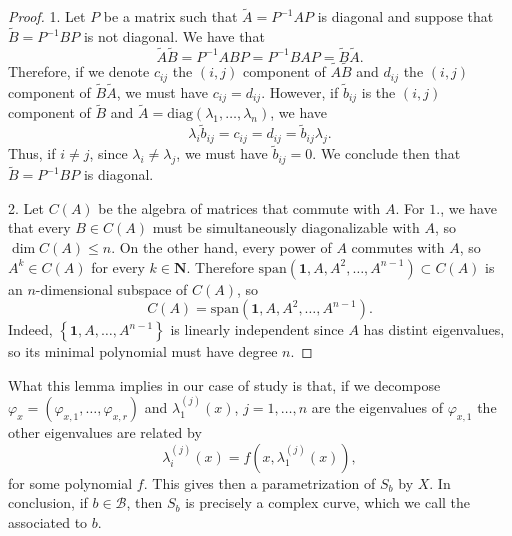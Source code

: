 \documentclass[12pt,a4paper]{book}
\theoremstyle{definition} \newtheorem{defn}[thm]{Definition}
\theoremstyle{definition} \newtheorem{ejemplo}[thm]{Example}
\theoremstyle{remark} \newtheorem{rem}[thm]{Remark}
\def\BB{\mathscr{B}}
\def\NN{\mathbf{N}}
\def\id{\mathbf{1}}
\let\emph\relax
\begin{document}
  \begin{proof}
    1. Let $P$ be a matrix such that $\tilde{A}=P^{-1}A P$ is diagonal and suppose that $\tilde{B}=P^{-1} B P$ is not diagonal. We have that
    \begin{equation*}
      \tilde{A}\tilde{B} = P^{-1} AB P = P^{-1} BA P = \tilde{B} \tilde{A}.
    \end{equation*}
    Therefore, if we denote $c_{ij}$ the $(i,j)$ component of $\tilde{A}\tilde{B}$ and $d_{ij}$ the $(i,j)$ component of $\tilde{B}\tilde{A}$, we must have $c_{ij} = d_{ij}$. However, if $\tilde{b}_{ij}$ is the $(i,j)$ component of $\tilde{B}$ and $\tilde{A} = \mathrm{diag}(\lambda_1,\dots,\lambda_n)$, we have
    \begin{equation*}
      \lambda_i \tilde{b}_{ij}=c_{ij}=d_{ij}=\tilde{b}_{ij} \lambda_j.
    \end{equation*}
    Thus, if $i \neq j$, since $\lambda_i \neq \lambda_j$, we must have $\tilde{b}_{ij}=0$. We conclude then that $\tilde{B}=P^{-1}BP$ is diagonal.

    2. Let $C(A)$ be the algebra of matrices that commute with $A$. For $1.$, we have that every $B \in C(A)$ must be simultaneously diagonalizable with $A$, so $\dim C(A) \leq n$. On the other hand, every power of $A$ commutes with $A$, so $A^k \in C(A)$ for every $k \in \NN$. Therefore $\mathrm{span}(\id,A,A^2,\dots,A^{n-1}) \subset C(A)$ is an $n$-dimensional subspace of $C(A)$, so $$C(A)=\mathrm{span}(\id, A,A^2,\dots,A^{n-1}).$$
    Indeed, $\left\{ \id,A,\dots,A^{n-1} \right\}$ is linearly independent since $A$ has distint eigenvalues, so its minimal polynomial must have degree $n$.
 \end{proof}

 What this lemma implies in our case of study is that, if we decompose $\varphi_x=(\varphi_{x,1},\dots,\varphi_{x,r})$ and $\lambda_1^{(j)}(x)$, $j=1,\dots,n$ are the eigenvalues of $\varphi_{x,1}$ the other eigenvalues are related by 
 \begin{equation*}
   \lambda^{(j)}_i(x)= f(x,\lambda^{(j)}_1(x)),
 \end{equation*}
 for some polynomial $f$. This gives then a parametrization of $S_b$ by $X$. In conclusion, if $b\in \BB$, then $S_b$ is precisely a complex curve, which we call the \emph{spectral curve} associated to $b$. 
\end{document}
